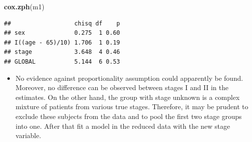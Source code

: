 \documentclass[
]{book}
\newenvironment{Shaded}{\begin{snugshade}}{\end{snugshade}}
\newcommand{\AttributeTok}[1]{\textcolor[rgb]{0.13,0.29,0.53}{#1}}
\newcommand{\DecValTok}[1]{\textcolor[rgb]{0.00,0.00,0.81}{#1}}
\newcommand{\FunctionTok}[1]{\textcolor[rgb]{0.13,0.29,0.53}{\textbf{#1}}}
\newcommand{\NormalTok}[1]{#1}
\newcommand{\OtherTok}[1]{\textcolor[rgb]{0.56,0.35,0.01}{#1}}
\newcommand{\SpecialCharTok}[1]{\textcolor[rgb]{0.81,0.36,0.00}{\textbf{#1}}}
\newcommand{\StringTok}[1]{\textcolor[rgb]{0.31,0.60,0.02}{#1}}
\providecommand{\tightlist}{%
  \setlength{\itemsep}{0pt}\setlength{\parskip}{0pt}}
\begin{document}
\begin{Shaded}
\begin{Highlighting}[]
\FunctionTok{cox.zph}\NormalTok{(m1)}
\end{Highlighting}
\end{Shaded}

\begin{verbatim}
##                  chisq df    p
## sex              0.275  1 0.60
## I((age - 65)/10) 1.706  1 0.19
## stage            3.648  4 0.46
## GLOBAL           5.144  6 0.53
\end{verbatim}

\begin{itemize}
\tightlist
\item
  No evidence against proportionality assumption could apparently be found.
  Moreover, no difference can be observed between stages I and II in the estimates.
  On the other hand, the
  group with stage unknown is a complex mixture of patients from various
  true stages. Therefore, it may be prudent to exclude these subjects from the data
  and to pool the first two stage groups into one. After that fit a model in
  the reduced data with the new stage variable.
\end{itemize}

\begin{Shaded}
\end{Shaded}
\end{document}
